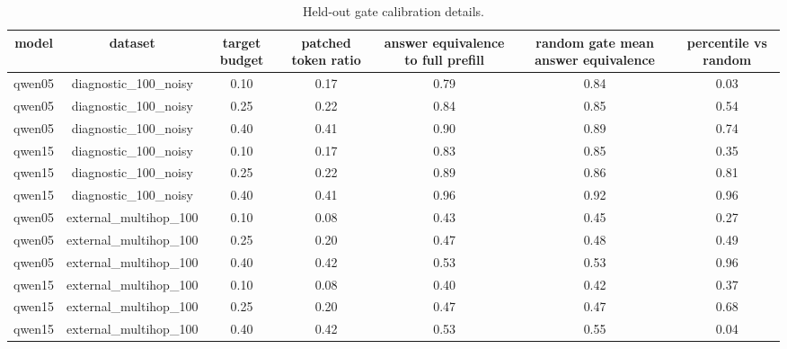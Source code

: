 \begin{table}[t]
\centering
\footnotesize
\begin{adjustbox}{max width=\textwidth}
\begin{tabular}{ccccccc}
\toprule
model & dataset & target budget & patched token ratio & answer equivalence to full prefill & random gate mean answer equivalence & percentile vs random \\
\midrule
qwen05 & diagnostic\_100\_noisy & 0.10 & 0.17 & 0.79 & 0.84 & 0.03 \\
qwen05 & diagnostic\_100\_noisy & 0.25 & 0.22 & 0.84 & 0.85 & 0.54 \\
qwen05 & diagnostic\_100\_noisy & 0.40 & 0.41 & 0.90 & 0.89 & 0.74 \\
qwen15 & diagnostic\_100\_noisy & 0.10 & 0.17 & 0.83 & 0.85 & 0.35 \\
qwen15 & diagnostic\_100\_noisy & 0.25 & 0.22 & 0.89 & 0.86 & 0.81 \\
qwen15 & diagnostic\_100\_noisy & 0.40 & 0.41 & 0.96 & 0.92 & 0.96 \\
qwen05 & external\_multihop\_100 & 0.10 & 0.08 & 0.43 & 0.45 & 0.27 \\
qwen05 & external\_multihop\_100 & 0.25 & 0.20 & 0.47 & 0.48 & 0.49 \\
qwen05 & external\_multihop\_100 & 0.40 & 0.42 & 0.53 & 0.53 & 0.96 \\
qwen15 & external\_multihop\_100 & 0.10 & 0.08 & 0.40 & 0.42 & 0.37 \\
qwen15 & external\_multihop\_100 & 0.25 & 0.20 & 0.47 & 0.47 & 0.68 \\
qwen15 & external\_multihop\_100 & 0.40 & 0.42 & 0.53 & 0.55 & 0.04 \\
\bottomrule
\end{tabular}
\end{adjustbox}
\caption{Held-out gate calibration details.}
\label{tab:app-heldout}
\end{table}
